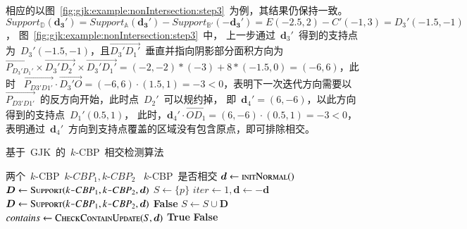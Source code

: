 相应的以图~\ref{fig:gjk:example:nonIntersection:step3}~为例，其结果仍保持一致。
$ Support_\mathbb{D}(\bm{d_3'})  = Support_\mathbb{A}(\bm{d_3'}) - Support_\mathbb{B'}(-\bm{d_3'}) = E(-2.5, 2) - C'(-1, 3) = D_3'(-1.5, -1)$，
图~\ref{fig:gjk:example:nonIntersection:step3}~中，
上一步通过~$\bm{d}_3'$~得到的支持点为~$D_3'(-1.5, -1)$，且$\overrightarrow{D_3'D_1'}$~垂直并指向阴影部分面积方向为~$\overrightarrow{P_{D_3'D_1'}}
\times \overrightarrow{D_3'D_2'} \times \overrightarrow{D_3'D_1'} =
(-2,-2)*(-3) + 8*(-1.5, 0) = (-6, 6)$，此时
~$\overrightarrow{P_{D3'D1'}} \cdot \overrightarrow{D_3'O} = (-6, 6) \cdot (1.5, 1) = -3 < 0$，表明下一次迭代方向需要以~$\overrightarrow{P_{D3'D1'}}$~的反方向开始，此时点~$D_2'$~可以规约掉，
即~$\bm{d}_4'= (6, -6)$，以此方向得到的支持点~$D_1'(0.5, 1)$，
此时，$\bm{d}_4' \cdot \overrightarrow{OD_1} = (6, -6) \cdot (0.5, 1) = -3 < 0 $，表明通过~$\bm{d}_4'$~方向到支持点覆盖的区域没有包含原点，即可排除相交。

\begin{algorithm}[htbp]
\small
\caption{基于~GJK~的~$k$-CBP~相交检测算法}
\label{alg:gjk}
\begin{algorithmic}[1]
\Require
两个~$k$-CBP~$k\texttt{-}CBP_1, k\texttt{-}CBP_2$
\Ensure
~$k$-CBP~是否相交
    \State $\bm{d} \gets \Call{initNormal}$
    \State $\bm{D} \gets \Call{Support}{k\texttt{-}CBP_1, k\texttt{-}CBP_2, \bm{d}}$
    \State $S \gets \{p\}$
    \State $iter \gets 1 , \bm{d} \gets -\bm{d}$
        \State $\bm{D} \gets \Call{Support}{k\texttt{-}CBP_1, k\texttt{-}CBP_2, \bm{d}}$
            \State \Return \textbf{False}
        \EndIf
        \State $S \gets S \cup \bm{D}$
        \State $ contains \gets \Call{CheckContainUpdate}{S, \bm{d}}$ 
            \State \Return \textbf{True} 
        \EndIf
    \EndWhile
    \State \Return \textbf{False} 
\EndFunction
\end{algorithmic}
\end{algorithm}

